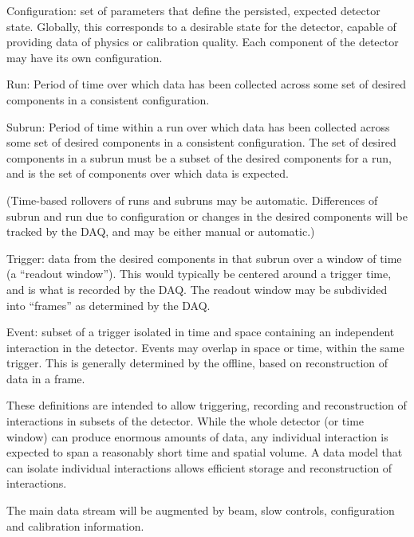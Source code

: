 \begin{description}

\item{Configuration:} set of parameters that define the persisted, expected detector state. Globally, this corresponds to a desirable state for the detector, capable of providing data of physics or calibration quality. Each component of the detector may have its own configuration.
 
\item{Run:} Period of time over which data has been collected across some set of desired components in a consistent configuration.
 
\item{Subrun:} Period of time within a run over which data has been collected across some set of desired components in a consistent configuration. The set of desired components in a subrun must be a subset of the desired components for a run, and is the set of components over which data is expected.
 
(Time-based rollovers of runs and subruns may be automatic. Differences of subrun and run due to configuration or changes in the desired components will be tracked by the DAQ, and may be either manual or automatic.)
 
\item{Trigger:} data from the desired components in that subrun over a window of time (a “readout window”). This would typically be centered around a trigger time, and is what is recorded by the DAQ. The readout window may be subdivided into “frames” as determined by the DAQ.
 
\item{Event:} subset of a trigger isolated in time and space containing an independent interaction in the detector. Events may overlap in space or time, within the same trigger. This is generally determined by the offline, based on reconstruction of data in a frame.

\end{description}

These definitions are intended to allow triggering, recording and reconstruction of interactions in subsets of the detector. While the whole detector (or time window) can produce enormous amounts of data, any individual interaction is expected to span a reasonably short time and spatial volume. A data model that can isolate individual interactions  allows efficient storage and reconstruction of interactions. 


The main data stream will be augmented by beam, slow controls,  configuration and calibration information. 


